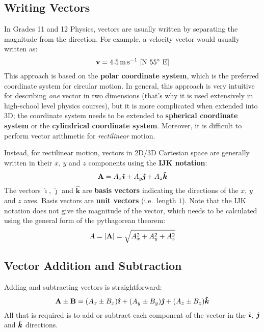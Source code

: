 \documentclass{../../../oss-handout}
\newcommand{\mb}[1]{\ensuremath\mathbf{#1}}
\newcommand{\iii}{\ensuremath\hat{\bm{\imath}}}
\newcommand{\jjj}{\ensuremath\hat{\bm{\jmath}}}
\newcommand{\kkk}{\ensuremath\hat{\bm{k}}}
\begin{document}
\subsection{Writing Vectors}
In Grades 11 and 12 Physics, vectors are usually written by separating the
magnitude from the direction. For example, a velocity vector would usually
written as:
\begin{equation*}
  \mb{v}=\SI{4.5}{\metre\per\second}\text{ [N \ang{55} E]}
\end{equation*}
This approach is based on the \textbf{polar coordinate system}, which is the
preferred coordinate system for circular motion. In general, this approach is
very intuitive for describing \emph{one} vector in
two dimensions (that's why it is used extensively in high-school level
physics courses), but it is more complicated when extended into 3D; the
coordinate system needs to be extended to \textbf{spherical coordinate system}
or the \textbf{cylindrical coordinate system}. Moreover, it is difficult to
perform vector arithmetic for \emph{rectilinear} motion.

Instead, for rectilinear motion, vectors in 2D/3D Cartesian space are generally
written in their $x$, $y$ and $z$ components using the \textbf{IJK notation}:
\begin{equation*}
  \mb{A}=A_x\bm{\hat{\imath}} + A_y\bm{\hat{\jmath}} + A_z\bm{\hat{k}}
\end{equation*}
The vectors $\bm{\hat{\imath}}$, $\bm{\hat{\jmath}}$ and $\bm{\hat{k}}$ are
\textbf{basis vectors} indicating the directions of the $x$, $y$ and $z$ axes.
Basis vectors are \textbf{unit vectors} (i.e.\ length $1$). Note that the
IJK notation does not give the magnitude of the vector, which needs to be
calculated using the general form of the pythagorean theorem:
\begin{equation*}
  A=|\mb{A}|=\sqrt{A_x^2 + A_y^2 + A_z^2}
\end{equation*}


\subsection{Vector Addition and Subtraction}

Adding and subtracting vectors is straightforward:
\begin{equation*}
  \mb{A}\pm\mb{B}=
  (A_x\pm B_x)\bm{\hat{\imath}} +
  (A_y\pm B_y)\bm{\hat{\jmath}} +
  (A_z\pm B_z)\bm{\hat{k}}
\end{equation*}
All that is required is to add or subtract each component of the vector in the
$\iii$, $\jjj$ and $\kkk$ directions.
\end{document}
